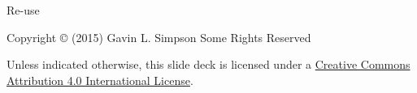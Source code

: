 \documentclass[10pt,ignorenonframetext,compress, aspectratio=169]{beamer}
\begin{document}
\begin{frame}{Re-use}

Copyright © (2015) Gavin L. Simpson Some Rights Reserved

Unless indicated otherwise, this slide deck is licensed under a
\href{http://creativecommons.org/licenses/by/4.0/}{Creative Commons
Attribution 4.0 International License}.

\begin{center}
  \ccby
\end{center}

\end{frame}
\end{document}
